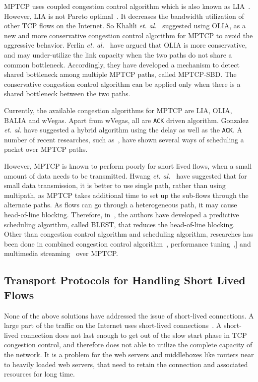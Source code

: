 MPTCP uses coupled congestion control algorithm which is also known as LIA~\cite{LIARFC6356}. However, LIA is not Pareto optimal~\cite{OLIARamin2012}. It decreases the bandwidth utilization of other TCP flows on the Internet. So Khalili \textit{et. al.}~\cite{OLIARamin2012} suggested using OLIA, as a new and more conservative congestion control algorithm for MPTCP to avoid the aggressive behavior. Ferlin \textit{et. al.}~\cite{MPTCP-SBD} have argued that OLIA is more conservative, and may under-utilize the link capacity when the two paths do not share a common bottleneck. Accordingly, they have developed a mechanism to detect shared bottleneck among multiple MPTCP paths, called MPTCP-SBD. The conservative congestion control algorithm can be applied only when there is a shared bottleneck between the two paths. 

Currently, the available congestion algorithms for MPTCP are LIA, OLIA, BALIA and wVegas\cite{wVegas}. Apart from wVegas, all are \texttt{ACK} driven algorithm. Gonzalez \textit{et. al.}\cite{Balia-wvegas} have suggested a hybrid algorithm using the delay as well as the \texttt{ACK}. A number of recent researches, such as~\cite{aschedulermptcp,blestschedular,scheadulerformptcp}, have shown several ways of scheduling a packet over MPTCP paths. 

However, MPTCP is known to perform poorly for short lived flows, when a small amount of data needs to be transmitted. Hwang \textit{et. al.}~\cite{scheadulerformptcp} have suggested that for small data transmission, it is better to use single path, rather than using multipath, as MPTCP takes additional time to set up the sub-flows through the alternate paths. As flows can go through a heterogeneous path, it may cause head-of-line blocking. Therefore, in~\cite{blestschedular}, the authors have developed a predictive scheduling algorithm, called BLEST, that reduces the head-of-line blocking. Other than congestion control algorithm and scheduling algorithm, researches has been done in combined congestion control algorithm~\cite{outofordermptcp}, performance tuning~\cite{optimization},] and multimedia streaming~\cite{streaming} over MPTCP.


\subsection{Transport Protocols for Handling Short Lived Flows}

None of the above solutions have addressed the issue of short-lived connections. A large part of the traffic on the Internet uses short-lived connections~\cite{kheirkhah2015short}. A short-lived connection does not last enough to get out of the slow start phase in TCP congestion control, and therefore does not able to utilize the complete capacity of the network. It is a problem for the web servers and middleboxes like routers near to heavily loaded web servers, that need to retain the connection and associated resources for long time. 

